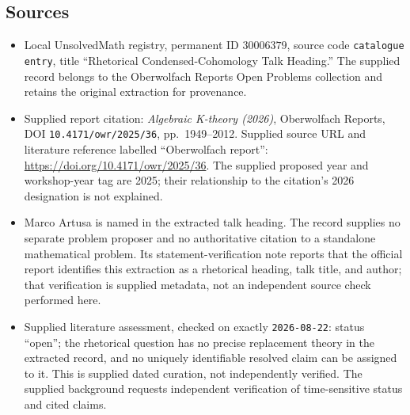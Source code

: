 \documentclass[11pt]{article}
\begin{document}
\subsection{Sources}
\begin{itemize}
\item Local UnsolvedMath registry, permanent ID \(30006379\), source code \texttt{catalogue entry}, title ``Rhetorical Condensed-Cohomology Talk Heading.'' The supplied record belongs to the Oberwolfach Reports Open Problems collection and retains the original extraction for provenance.
\item Supplied report citation: \emph{Algebraic K-theory (2026)}, Oberwolfach Reports, DOI \texttt{10.4171/owr/2025/36}, pp.\ 1949--2012. Supplied source URL and literature reference labelled ``Oberwolfach report'': \url{https://doi.org/10.4171/owr/2025/36}. The supplied proposed year and workshop-year tag are 2025; their relationship to the citation's 2026 designation is not explained.
\item Marco Artusa is named in the extracted talk heading. The record supplies no separate problem proposer and no authoritative citation to a standalone mathematical problem. Its statement-verification note reports that the official report identifies this extraction as a rhetorical heading, talk title, and author; that verification is supplied metadata, not an independent source check performed here.
\item Supplied literature assessment, checked on exactly \texttt{2026-08-22}: status ``open''; the rhetorical question has no precise replacement theory in the extracted record, and no uniquely identifiable resolved claim can be assigned to it. This is supplied dated curation, not independently verified. The supplied background requests independent verification of time-sensitive status and cited claims.
\end{itemize}
\end{document}
